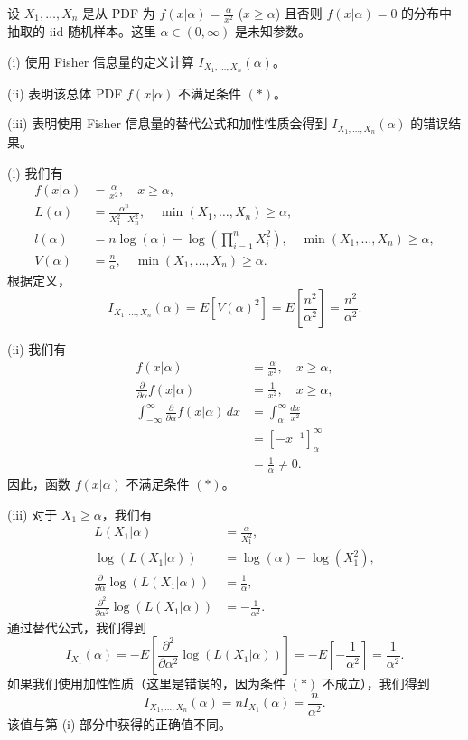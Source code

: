 \begin{questions}
\question 设 $X_1, \dots, X_n$ 是从 PDF 为 $f(x|\alpha) = \frac{\alpha}{x^2}$ ($x \geq \alpha$) 且否则 $f(x|\alpha) = 0$ 的分布中抽取的 iid 随机样本。这里 $\alpha \in (0, \infty)$ 是未知参数。

(i) 使用 Fisher 信息量的定义计算 $I_{X_1, \dots, X_n}(\alpha)$。

(ii) 表明该总体 PDF $f(x|\alpha)$ 不满足条件 $(*)$。

(iii) 表明使用 Fisher 信息量的替代公式和加性性质会得到 $I_{X_1, \dots, X_n}(\alpha)$ 的错误结果。

\begin{solution}
(i) 我们有
\begin{align*}
f(x|\alpha) &= \frac{\alpha}{x^2}, \quad x \geq \alpha, \\
L(\alpha) &= \frac{\alpha^n}{X_1^2 \cdots X_n^2}, \quad \min(X_1, \dots, X_n) \geq \alpha, \\
l(\alpha) &= n \log(\alpha) - \log\left( \prod_{i=1}^n X_i^2 \right), \quad \min(X_1, \dots, X_n) \geq \alpha, \\
V(\alpha) &= \frac{n}{\alpha}, \quad \min(X_1, \dots, X_n) \geq \alpha.
\end{align*}
根据定义，
\[
I_{X_1, \dots, X_n}(\alpha) = E[V(\alpha)^2] = E\left[ \frac{n^2}{\alpha^2} \right] = \frac{n^2}{\alpha^2}.
\]

(ii) 我们有
\begin{align*}
f(x|\alpha) &= \frac{\alpha}{x^2}, \quad x \geq \alpha, \\
\frac{\partial}{\partial \alpha} f(x|\alpha) &= \frac{1}{x^2}, \quad x \geq \alpha, \\
\int_{-\infty}^{\infty} \frac{\partial}{\partial \alpha} f(x|\alpha) \, dx &= \int_{\alpha}^{\infty} \frac{dx}{x^2} \\
&= \left[ -x^{-1} \right]_{\alpha}^{\infty} \\
&= \frac{1}{\alpha} \neq 0.
\end{align*}
因此，函数 $f(x|\alpha)$ 不满足条件 $(*)$。

(iii) 对于 $X_1 \geq \alpha$，我们有
\begin{align*}
L(X_1|\alpha) &= \frac{\alpha}{X_1^2}, \\
\log(L(X_1|\alpha)) &= \log(\alpha) - \log(X_1^2), \\
\frac{\partial}{\partial \alpha} \log(L(X_1|\alpha)) &= \frac{1}{\alpha}, \\
\frac{\partial^2}{\partial \alpha^2} \log(L(X_1|\alpha)) &= -\frac{1}{\alpha^2}.
\end{align*}
通过替代公式，我们得到
\[
I_{X_1}(\alpha) = -E\left[ \frac{\partial^2}{\partial \alpha^2} \log(L(X_1|\alpha)) \right] = -E\left[ -\frac{1}{\alpha^2} \right] = \frac{1}{\alpha^2}.
\]
如果我们使用加性性质（这里是错误的，因为条件 $(*)$ 不成立），我们得到
\[
I_{X_1, \dots, X_n}(\alpha) = n I_{X_1}(\alpha) = \frac{n}{\alpha^2}.
\]
该值与第 (i) 部分中获得的正确值不同。
\end{solution}


\end{questions}
